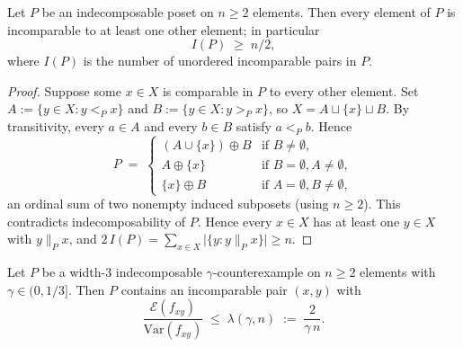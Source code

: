 \begin{lemma}
\label{lem:indec-incompairs}
Let $P$ be an indecomposable poset on $n \ge 2$ elements. Then every
element of $P$ is incomparable to at least one other element; in
particular
\[
  I(P) \;\ge\; n/2,
\]
where $I(P)$ is the number of unordered incomparable pairs in $P$.
\end{lemma}

\begin{proof}
Suppose some $x \in X$ is comparable in $P$ to every other element.
Set $A := \{y \in X : y <_P x\}$ and $B := \{y \in X : y >_P x\}$, so
$X = A \sqcup \{x\} \sqcup B$. By transitivity, every $a \in A$ and
every $b \in B$ satisfy $a <_P b$. Hence
\[
  P \;=\;
  \begin{cases}
    (A \cup \{x\}) \oplus B & \text{if } B \ne \emptyset, \\
    A \oplus \{x\}          & \text{if } B = \emptyset, A \ne \emptyset, \\
    \{x\} \oplus B          & \text{if } A = \emptyset, B \ne \emptyset,
  \end{cases}
\]
an ordinal sum of two nonempty induced subposets (using $n \ge 2$).
This contradicts indecomposability of $P$. Hence every $x \in X$ has
at least one $y \in X$ with $y \parallel_P x$, and
$2\,I(P) = \sum_{x \in X} \bigl|\{y : y \parallel_P x\}\bigr| \ge n$.
\end{proof}

\begin{lemma}
\label{lem:frozen-pair-existence}
Let $P$ be a width-$3$ indecomposable $\gamma$-counterexample on
$n \ge 2$ elements with $\gamma \in (0, 1/3]$. Then $P$ contains an
incomparable pair $(x, y)$ with
\[
  \frac{\mathcal{E}(f_{xy})}{\mathrm{Var}(f_{xy})}
  \;\le\;
  \lambda(\gamma, n) \;:=\; \frac{2}{\gamma\, n}.
\]
\end{lemma}


